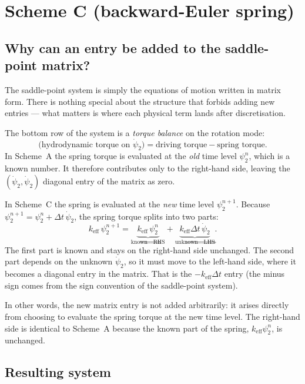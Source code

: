 \documentclass[11pt]{article}
\newcommand{\dt}{\Delta t}
\newcommand{\keff}{k_\mathrm{eff}}
\begin{document}
\section{Scheme C (backward-Euler spring)}

\subsection*{Why can an entry be added to the saddle-point matrix?}

The saddle-point system is simply the equations of motion written in
matrix form.  There is nothing special about the structure that forbids
adding new entries --- what matters is where each physical term lands
after discretisation.

The bottom row of the system is a \emph{torque balance} on the rotation
mode:
\[
  \text{(hydrodynamic torque on }\dot\psi_2\text{)}
  = \text{driving torque} - \text{spring torque}.
\]
In Scheme~A the spring torque is evaluated at the \emph{old} time level
$\psi_2^n$, which is a known number.  It therefore contributes only to
the right-hand side, leaving the $(\dot\psi_2,\dot\psi_2)$ diagonal
entry of the matrix as zero.

In Scheme~C the spring is evaluated at the \emph{new} time level
$\psi_2^{n+1}$.  Because $\psi_2^{n+1} = \psi_2^n + \dt\,\dot\psi_2$,
the spring torque splits into two parts:
\[
  \keff\,\psi_2^{n+1}
  = \underbrace{\keff\,\psi_2^n}_{\text{known} \Rightarrow \text{RHS}}
  + \underbrace{\keff\dt\,\dot\psi_2}_{\text{unknown} \Rightarrow \text{LHS}}.
\]
The first part is known and stays on the right-hand side unchanged.
The second part depends on the unknown $\dot\psi_2$, so it must move
to the left-hand side, where it becomes a diagonal entry in the matrix.
That is the $-\keff\dt$ entry (the minus sign comes from the sign
convention of the saddle-point system).

In other words, the new matrix entry is not added arbitrarily: it arises
directly from choosing to evaluate the spring torque at the new time
level.  The right-hand side is identical to Scheme~A because the known
part of the spring, $\keff\psi_2^n$, is unchanged.

\subsection*{Resulting system}
\end{document}
